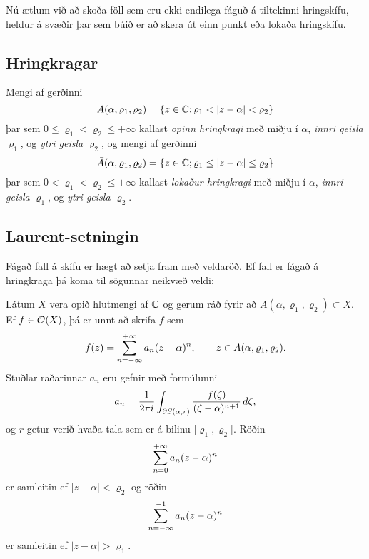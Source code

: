 Nú ætlum við að skoða föll sem eru ekki endilega fáguð á tiltekinni
hringskífu, heldur á svæðir þar sem búið er að skera út einn punkt
eða lokaða hringskífu.

\subsection*{Hringkragar}

Mengi af gerðinni 
$$A(\alpha,\varrho_1,\varrho_2)=\set{z\in \C;
\varrho_1<|z-\alpha|<\varrho_2}
$$ 
þar sem
$0\leq\varrho_1<\varrho_2\leq +\infty$
kallast {\it opinn hringkragi
}
með miðju í $\alpha$, {\it innri geisla}
$\varrho_1$, og {\it ytri geisla $\varrho_2$},
og mengi af gerðinni 
$$\bar A(\alpha,\varrho_1,\varrho_2)={\{z\in {\mathbb C};
\varrho_1\leq|z-\alpha|\leq\varrho_2\}}
$$ þar sem
$0<\varrho_1<\varrho_2\leq +\infty$
kallast {\it lokaður hringkragi} með miðju í $\alpha$, {\it innri geisla}
$\varrho_1$, og {\it ytri geisla $\varrho_2$}.


\subsection*{Laurent-setningin}
 
Fágað fall á skífu er hægt að setja fram með veldaröð.  
Ef fall er fágað á hringkraga þá koma til sögunnar neikvæð veldi:

\begin{se}
Látum $X$ vera opið hlutmengi af ${\mathbb C}$ og gerum ráð fyrir að
$A(\alpha,\varrho_1,\varrho_2)\subset X$.  Ef
$f\in {\cal O}(X)$, þá er unnt að skrifa $f$ sem
 \begin{equation*}f(z)=\sum_{n=-\infty}\sp{+\infty}a_n(z-\alpha)\sp n, \qquad z\in
A(\alpha,\varrho_1,\varrho_2).
\label{10.5.1}
 \end{equation*}
Stuðlar raðarinnar $a_n$ eru gefnir með formúlunni
 \begin{equation*}a_n=\dfrac 1{2\pi i}\int_{\partial S(\alpha,r)} \dfrac{f(\zeta)}
{(\zeta-\alpha)\sp{n+1}} \, d\zeta,
\label{10.5.2}
 \end{equation*}
og $r$ getur verið hvaða tala sem er á bilinu
$]\varrho_1,\varrho_2[$.  Röðin
$$\sum_{n=0}\sp{+\infty}a_n(z-\alpha)\sp n$$ 
er samleitin ef
$|z-\alpha|<\varrho_2$ og  röðin
$$\sum_{n=-\infty}\sp{-1}a_n(z-\alpha)\sp n$$ 
er samleitin ef
$|z-\alpha|>\varrho_1$.

\end{se}

